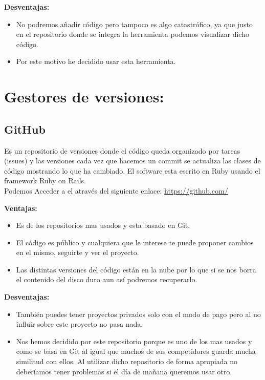 \textbf{Desventajas:}

\begin{itemize}
\item No podremos añadir código pero tampoco es algo catastrófico, ya que justo en el repositorio donde se integra la herramienta podemos visualizar dicho código.

\item Por este motivo he decidido usar esta herramienta.
\end{itemize}

\section{Gestores de versiones:}
\subsection{GitHub}
Es un repositorio de versiones donde el código queda organizado por tareas (issues) y las versiones cada vez que hacemos un commit se actualiza las clases de código mostrando lo que ha cambiado.
El software esta escrito en Ruby usando el framework Ruby on Rails.\\
Podemos Acceder a el através del siguiente enlace: 
\url{https://github.com/}



\textbf{Ventajas:}

\begin{itemize}
\item Es de los repositorios mas usados y esta basado en Git.

\item El código es público y cualquiera que le interese te puede proponer cambios en el mismo, seguirte y ver el proyecto.

\item Las distintas versiones del código están en la nube por lo que si se nos borra el contenido del disco duro aun así podremos recuperarlo.
\end{itemize}

\textbf{Desventajas:}

\begin{itemize}
\item También puedes tener proyectos privados solo con el modo de pago pero al no influir sobre este proyecto no pasa nada.

\item Nos hemos decidido por este repositorio porque es uno de los mas usados y como se basa en Git al igual que muchos de sus competidores guarda mucha similitud con ellos.
Al utilizar dicho repositorio de forma apropiada no deberíamos tener problemas si el día de mañana queremos usar otro.
\end{itemize}

